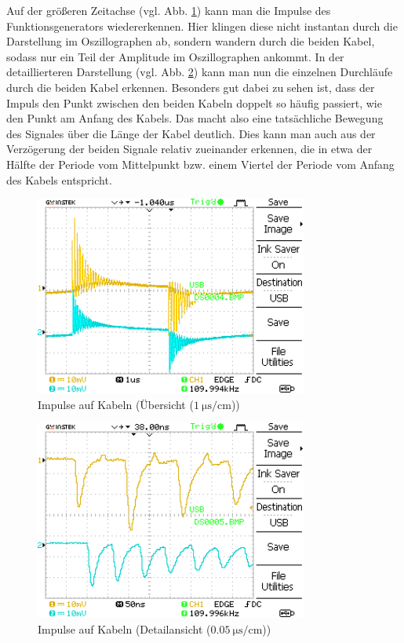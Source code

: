 \documentclass{article}
\begin{document}
			Auf der größeren Zeitachse (vgl. Abb. \ref{fig:DS0004}) kann man die Impulse des Funktionsgenerators wiedererkennen. Hier klingen diese nicht instantan durch die Darstellung im Oszillographen ab, sondern wandern durch die beiden Kabel, sodass nur ein Teil der Amplitude im Oszillographen ankommt. In der detaillierteren Darstellung (vgl. Abb. \ref{fig:DS0005}) kann man nun die einzelnen Durchläufe durch die beiden Kabel erkennen. Besonders gut dabei zu sehen ist, dass der Impuls den Punkt zwischen den beiden Kabeln doppelt so häufig passiert, wie den Punkt am Anfang des Kabels. Das macht also eine tatsächliche Bewegung des Signales über die Länge der Kabel deutlich. Dies kann man auch aus der Verzögerung der beiden Signale relativ zueinander erkennen, die in etwa der Hälfte der Periode vom Mittelpunkt bzw. einem Viertel der Periode vom Anfang des Kabels entspricht. 
			
			\begin{figure}[H]
				\centering
				\includegraphics[width=0.8\textwidth]{MesswerteVersuch1/DS0004.png}
				\caption{Impulse auf Kabeln (Übersicht ($\SI{1}{\micro\second\per\centi\meter}$))}
				\label{fig:DS0004}
			\end{figure}
			\begin{figure}[H]
				\centering
				\includegraphics[width=0.8\textwidth]{MesswerteVersuch1/DS0005.png}
				\caption{Impulse auf Kabeln (Detailansicht ($\SI{0.05}{\micro\second\per\centi\meter}$))}
				\label{fig:DS0005}
			\end{figure}
		
\end{document}
